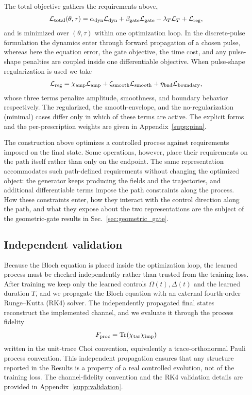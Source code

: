 \documentclass[aps,prx,reprint,superscriptaddress,nofootinbib,longbibliography,floatfix,showkeys]{revtex4-2}
\newcommand{\Ldyn}{\mathcal L_{\rm dyn}}
\newcommand{\Lgate}{\mathcal L_{\rm gate}}
\newcommand{\Lreg}{\mathcal L_{\rm reg}}
\newcommand{\LT}{\mathcal L_T}
\newcommand{\Ltotal}{\mathcal L_{\rm total}}
\newcommand{\appsecref}[1]{Appendix~\hyperref[#1]{\ref*{#1}}}
\begin{document}
The total objective gathers the requirements above,
\begin{equation}
    \Ltotal(\theta,\tau)=
    \alpha_{\rm dyn}\Ldyn+
    \beta_{\rm gate}\Lgate+
    \lambda_T\LT+
    \Lreg,
    \label{eq:Ltotal_main}
\end{equation}
and is minimized over $(\theta,\tau)$ within one optimization loop.  In the discrete-pulse formulation the dynamics enter through forward propagation of a chosen pulse, whereas here the equation error, the gate objective, the time cost, and any pulse-shape penalties are coupled inside one differentiable objective.  When pulse-shape regularization is used we take
\begin{equation}
    \Lreg=
    \chi_{\rm amp}\mathcal L_{\rm amp}+
    \zeta_{\rm smooth}\mathcal L_{\rm smooth}+
    \eta_{\rm bnd}\mathcal L_{\rm boundary},
    \label{eq:Lreg_main}
\end{equation}
whose three terms penalize amplitude, smoothness, and boundary behavior respectively.  The regularized, the smooth-envelope, and the no-regularization (minimal) cases differ only in which of these terms are active.  The explicit forms and the per-prescription weights are given in \appsecref{supp:pinn}.

The construction above optimizes a controlled process against requirements imposed on the final state.  Some operations, however, place their requirements on the path itself rather than only on the endpoint.  The same representation accommodates such path-defined requirements without changing the optimized object: the generator keeps producing the fields and the trajectories, and additional differentiable terms impose the path constraints along the process.  How these constraints enter, how they interact with the control direction along the path, and what they expose about the two representations are the subject of the geometric-gate results in Sec.~\ref{sec:geometric_gate}.

\subsection{Independent validation}

Because the Bloch equation is placed inside the optimization loop, the learned process must be checked independently rather than trusted from the training loss.  After training we keep only the learned controls $\Omega(t),\Delta(t)$ and the learned duration $T$, and we propagate the Bloch equation with an external fourth-order Runge--Kutta (RK4) solver.  The independently propagated final states reconstruct the implemented channel, and we evaluate it through the process fidelity
\begin{equation}
    F_{\rm proc}=\operatorname{Tr}(\chi_{\rm tar}\chi_{\rm imp})
    \label{eq:Fproc_main}
\end{equation}
written in the unit-trace Choi convention, equivalently a trace-orthonormal Pauli process convention.  This independent propagation ensures that any structure reported in the Results is a property of a real controlled evolution, not of the training loss.  The channel-fidelity convention and the RK4 validation details are provided in \appsecref{supp:validation}.
\end{document}
